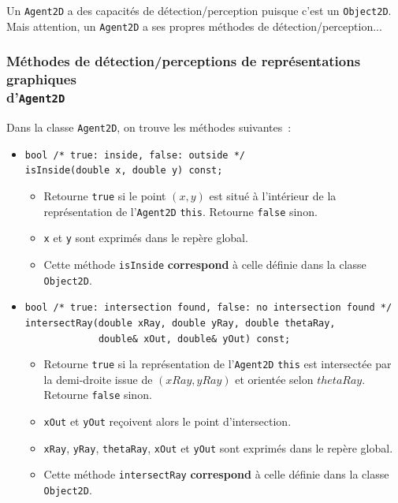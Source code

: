 \documentclass[12pt]{article}
\begin{document}
Un {\tt Agent2D} a des capacit\'es de d\'etection/perception
puisque c'est un {\tt Object2D}.
Mais attention, un {\tt Agent2D} a ses propres m\'ethodes de
d\'etection/perception...

\subsubsection{M\'ethodes de d\'etection/perceptions
de repr\'esentations graphiques\\d'{\tt Agent2D}}

Dans la classe {\tt Agent2D}, on trouve les m\'ethodes suivantes~:

\begin{itemize}
\item \verb|bool /* true: inside, false: outside */| \\
      \verb!isInside(double x, double y) const;!
      \begin{itemize}
      \item Retourne {\tt true} si le point $(x,y)$ est situ\'e \`a
            l'int\'erieur de la repr\'esentation de l'{\tt Agent2D}
            {\tt *this}.
            Retourne {\tt false} sinon.
      \item \verb!x! et \verb!y! sont exprim\'es dans le rep\`ere global.
      \item Cette m\'ethode {\tt isInside} {\bf correspond} \`a celle
            d\'efinie dans la classe {\tt Object2D}.
      \end{itemize}
\item \verb|bool /* true: intersection found, false: no intersection found */|\\
      \verb!intersectRay(double xRay, double yRay, double thetaRay,!\\
      \verb!             double& xOut, double& yOut) const;!
      \begin{itemize}
      \item  Retourne {\tt true} si la repr\'esentation de l'{\tt Agent2D}
             {\tt *this} est intersect\'ee par la demi-droite issue de
             $(xRay,yRay)$ et orient\'ee selon $thetaRay$.
             Retourne {\tt false} sinon.
      \item \verb!xOut! et \verb!yOut! re\c coivent alors le point
            d'intersection.
      \item \verb!xRay!, \verb!yRay!, \verb!thetaRay!, \verb!xOut! et
            \verb!yOut! sont exprim\'es dans le rep\`ere global.
      \item Cette m\'ethode {\tt intersectRay} {\bf correspond}
            \`a celle d\'efinie dans la classe {\tt Object2D}.
      \end{itemize}


\end{itemize}
\end{document}
